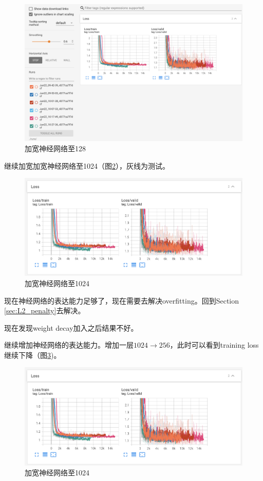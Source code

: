 \documentclass{article}
\begin{document}
\begin{CJK}{UTF8}{gbsn}
\begin{figure}[htbp]
    \centering
    \includegraphics[width=\linewidth]{graphics/FC_128.png}
    \caption{加宽神经网络至128}
    \label{fig:FC_128}
\end{figure}

继续加宽加宽神经网络至1024（图\ref{fig:FC_1024}），灰线为测试。

\begin{figure}[htbp]
    \centering
    \includegraphics[width=\linewidth]{graphics/FC_1024.png}
    \caption{加宽神经网络至1024}
    \label{fig:FC_1024}
\end{figure}

现在神经网络的表达能力足够了，现在需要去解决overfitting。回到Section \ref{sec:L2_penalty}去解决。

现在发现weight decay加入之后结果不好。

继续增加神经网络的表达能力。增加一层$1024 \rightarrow 256$，此时可以看到training loss继续下降（图\ref{fig:FC_1024_FC_256})。

\begin{figure}[htbp]
    \centering
    \includegraphics[width=\linewidth]{graphics/FC_1024.png}
    \caption{加宽神经网络至1024}
    \label{fig:FC_1024_FC_256}
\end{figure}


\end{CJK}
\end{document}
